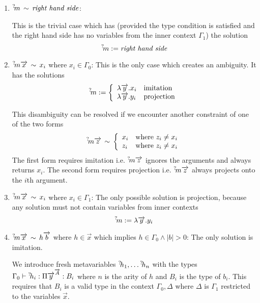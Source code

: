 \begin{enumerate}

    \item ${{}^? \kern-0.2em m} \,\sim\, \text{\emph{right hand side}}$:

        This is the trivial case which has (provided the type
        condition is satisfied and the right hand side has no variables from the
        inner context $\Gamma_1$) the solution
        $$
            {{}^? \kern-0.2em m} := \text{\emph{right hand side}}
        $$


    \item ${{}^? \kern-0.2em m} {\overrightarrow {x}} \,\sim\, x_i$ where $x_i \in \Gamma_0$:
        This is the
        only case which creates an ambiguity. It has the solutions
        $$
            {{}^? \kern-0.2em m} := \left\{ \begin{array}{lllll} 
                \lambda {\overrightarrow {y}}. x_i & \text{imitation}
                \\
                \lambda {\overrightarrow {y}}. y_i & \text{projection}
             \end{array} \right.
        $$

        This disambiguity can be resolved if we encounter another constraint of
        one of the two forms
        $$
            {{}^? \kern-0.2em m} {\overrightarrow {z}} \,\sim\,
            \left\{ \begin{array}{lllll} 
                x_i &\text{where } z_i \ne x_i
                \\
                z_i &\text{where } z_i \ne x_i
             \end{array} \right.
        $$
        The first form requires imitation i.e. ${{}^? \kern-0.2em m} {\overrightarrow {z}}$ ignores the
        arguments and always returns $x_i$. The second form requires projection
        i.e. ${{}^? \kern-0.2em m} {\overrightarrow {z}}$ always projects onto the $i$th argument.


    \item ${{}^? \kern-0.2em m} {\overrightarrow {x}} \,\sim\, x_i$ where $x_i \in \Gamma_1$: The only
        possible solution is projection, because any solution must not contain
        variables from inner contexts
        $$
            {{}^? \kern-0.2em m} := \lambda {\overrightarrow {y}} . y_i
        $$


    \item ${{}^? \kern-0.2em m} {\overrightarrow {x}} \,\sim\, h {\overrightarrow {b}}$ where $h \in \vec x$ which implies  $h \in
        \Gamma_0 \land |b| > 0$:
        The only solution is imitation.

        We introduce fresh metavariables ${{}^? \kern-0.2em h}_1, \ldots {{}^? \kern-0.2em h}_n$ with the
        types $\Gamma_0 \vdash {{}^? \kern-0.2em h}_i : \Pi {\overrightarrow {y}}^{{\overrightarrow {A}}} : B_i$ where $n$
        is the arity of $h$ and $B_i$ is the type of $b_i$. This requires that
        $B_i$ is a valid type in the context $\Gamma_0, \Delta$ where $\Delta$
        is $\Gamma_1$ restricted to the variables $\vec x$.


\end{enumerate}
